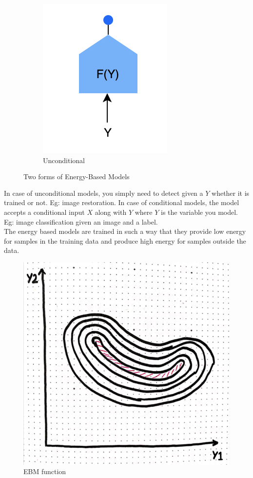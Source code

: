 \begin{figure}[htb]
\begin{subfigure}[b]{0.25\textwidth}
        \includegraphics[width=\textwidth]{lectures/08-a/images/unconditional_EBM.png}	
        \caption{Unconditional}	
        \label{fig:8a_unconditional}	
    \end{subfigure}	
    \caption{Two forms of Energy-Based Models}\label{fig:EBM}	
\end{figure}	

In case of unconditional models, you simply need to detect given a $Y$ whether it is trained or not. Eg: image restoration.
In case of conditional models, the model accepts a conditional input $X$ along with $Y$ where $Y$ is the variable you model. Eg: image classification given an image and a label.\\

The energy based models are trained in such a way that they provide low energy for samples in the training data and produce high energy for samples outside the data.
\begin{figure}[!h]
    \centering
    \includegraphics[width=0.4\linewidth]{lectures/08-a/images/EBM_function.png}
    \caption{EBM function}
    \label{fig:EBM_function}
\end{figure}
